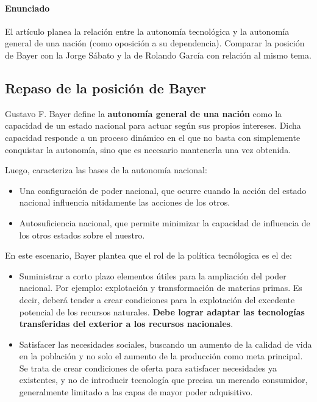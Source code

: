 \paragraph{Enunciado}
El artículo planea la relación entre la autonomía tecnológica y la autonomía
general de una nación (como oposición a su dependencia).
Comparar la posición de Bayer con la Jorge Sábato y la de Rolando García con relación al mismo tema.

\subsection*{Repaso de la posición de Bayer}

Gustavo F. Bayer define la \textbf{autonomía general de una nación}  como la capacidad
de un estado nacional para actuar según sus propios intereses. Dicha capacidad
responde a un proceso dinámico en el que no basta con simplemente conquistar la autonomía,
sino que es necesario mantenerla una vez obtenida.

Luego, caracteriza las bases de la autonomía nacional:
\begin{itemize}
    \item Una configuración de poder nacional, que ocurre cuando la acción del estado nacional
        influencia nitidamente las acciones de los otros.
    \item Autosuficiencia nacional, que permite minimizar la capacidad de influencia
        de los otros estados sobre el nuestro.
\end{itemize}

En este escenario, Bayer plantea que el rol de la política tecnólogica es el de:
\begin{itemize}
    \item Suministrar a corto plazo elementos útiles para la ampliación del poder nacional.
        Por ejemplo: explotación y transformación de materias primas. Es decir,
        deberá tender a crear condiciones para la explotación del excedente potencial de los recursos
        naturales. \textbf{Debe lograr adaptar las tecnologías transferidas del exterior a los
        recursos nacionales}.
    \item Satisfacer las necesidades sociales, buscando un aumento de la calidad de vida
        en la población y no solo el aumento de la producción como meta principal.
        Se trata de crear condiciones de oferta para satisfacer necesidades ya existentes,
        y no de introducir tecnología que precisa un mercado consumidor,
        generalmente limitado a las capas de mayor poder adquisitivo.
\end{itemize}

